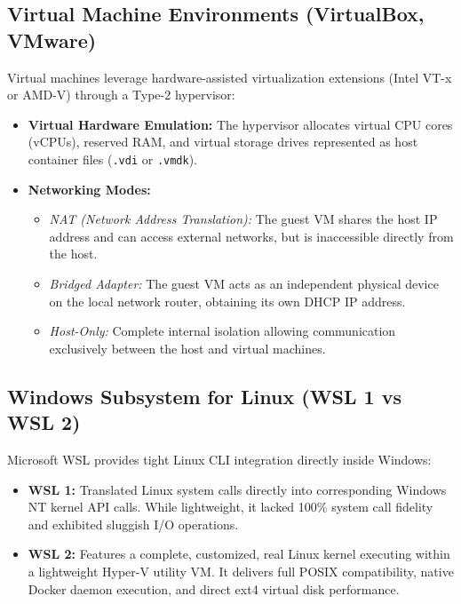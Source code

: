 \subsection{Virtual Machine Environments (VirtualBox, VMware)}
Virtual machines leverage hardware-assisted virtualization extensions (Intel VT-x or AMD-V) through a Type-2 hypervisor:
\begin{itemize}[leftmargin=1.5em]
    \item \textbf{Virtual Hardware Emulation:} The hypervisor allocates virtual CPU cores (vCPUs), reserved RAM, and virtual storage drives represented as host container files (\texttt{.vdi} or \texttt{.vmdk}).
    \item \textbf{Networking Modes:}
    \begin{itemize}
        \item \textit{NAT (Network Address Translation):} The guest VM shares the host IP address and can access external networks, but is inaccessible directly from the host.
        \item \textit{Bridged Adapter:} The guest VM acts as an independent physical device on the local network router, obtaining its own DHCP IP address.
        \item \textit{Host-Only:} Complete internal isolation allowing communication exclusively between the host and virtual machines.
    \end{itemize}
\end{itemize}

\subsection{Windows Subsystem for Linux (WSL 1 vs WSL 2)}
Microsoft WSL provides tight Linux CLI integration directly inside Windows:
\begin{itemize}[leftmargin=1.5em]
    \item \textbf{WSL 1:} Translated Linux system calls directly into corresponding Windows NT kernel API calls. While lightweight, it lacked 100\% system call fidelity and exhibited sluggish I/O operations.
    \item \textbf{WSL 2:} Features a complete, customized, real Linux kernel executing within a lightweight Hyper-V utility VM. It delivers full POSIX compatibility, native Docker daemon execution, and direct ext4 virtual disk performance.
\end{itemize}

